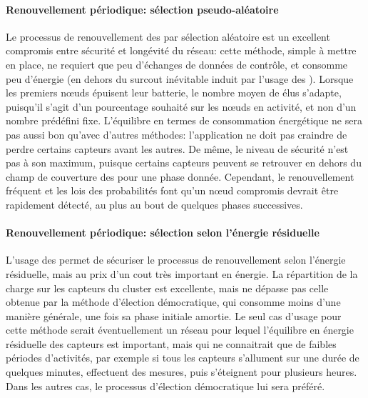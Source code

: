 \paragraph{Renouvellement périodique: sélection pseudo-aléatoire}
Le processus de renouvellement des \cns par sélection aléatoire est un excellent compromis entre sécurité et longévité du réseau: cette méthode, simple à mettre en place, ne requiert que peu d'échanges de données de contrôle, et consomme peu d'énergie (en dehors du surcout inévitable induit par l'usage des \cns).
Lorsque les premiers nœuds épuisent leur batterie, le nombre moyen de \cns élus s'adapte, puisqu'il s'agit d'un pourcentage souhaité sur les nœuds en activité, et non d'un nombre prédéfini fixe.
L'équilibre en termes de consommation énergétique ne sera pas aussi bon qu'avec d'autres méthodes: l'application ne doit pas craindre de perdre certains capteurs avant les autres.
De même, le niveau de sécurité n'est pas à son maximum, puisque certains capteurs peuvent se retrouver en dehors du champ de couverture des \cns pour une phase donnée.
Cependant, le renouvellement fréquent et les lois des probabilités font qu'un nœud compromis devrait être rapidement détecté, au plus au bout de quelques phases successives.

\paragraph{Renouvellement périodique: sélection selon l'énergie résiduelle}
L'usage des \vns permet de sécuriser le processus de renouvellement selon l'énergie résiduelle, mais au prix d'un cout très important en énergie.
La répartition de la charge sur les capteurs du cluster est excellente, mais ne dépasse pas celle obtenue par la méthode d'élection démocratique, qui consomme moins d'une manière générale, une fois sa phase initiale amortie.
Le seul cas d'usage pour cette méthode serait éventuellement un réseau pour lequel l'équilibre en énergie résiduelle des capteurs est important, mais qui ne connaitrait que de faibles périodes d'activités, par exemple si tous les capteurs s'allument sur une durée de quelques minutes, effectuent des mesures, puis s'éteignent pour plusieurs heures.
Dans les autres cas, le processus d'élection démocratique lui sera préféré.

